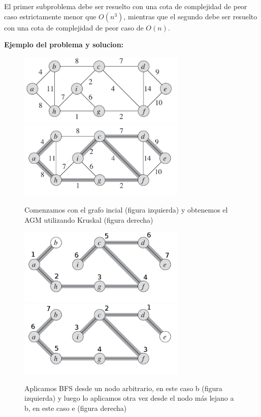 \documentclass[a4paper, 10pt, twoside]{article}
\begin{document}
El primer subproblema debe ser resuelto con una cota de complejidad de peor caso estrictamente menor que $O(n^3)$, mientras que el segundo debe ser resuelto con una cota de complejidad de peor caso de $O(n)$.

\textbf{Ejemplo del problema y solucion:}

\begin{figure}[H]
\includegraphics[width=80mm]{ej2aInicial.png}
\includegraphics[width=80mm]{ej2aKruskal.png}
\caption{Comenzamos con el grafo incial (figura izquierda) y obtenemos el AGM utilizando Kruskal (figura derecha)}
\label{overflow}
\end{figure}  

\begin{figure}[H]
\includegraphics[width=80mm]{ej2aBFS1.png}
\includegraphics[width=80mm]{ej2aBFS2.png}
\caption{Aplicamos BFS desde un nodo arbitrario, en este caso b (figura izquierda) y luego lo aplicamos otra vez desde el nodo más lejano a b, en este caso e (figura derecha)}
\label{overflow}
\end{figure}  
\end{document}
